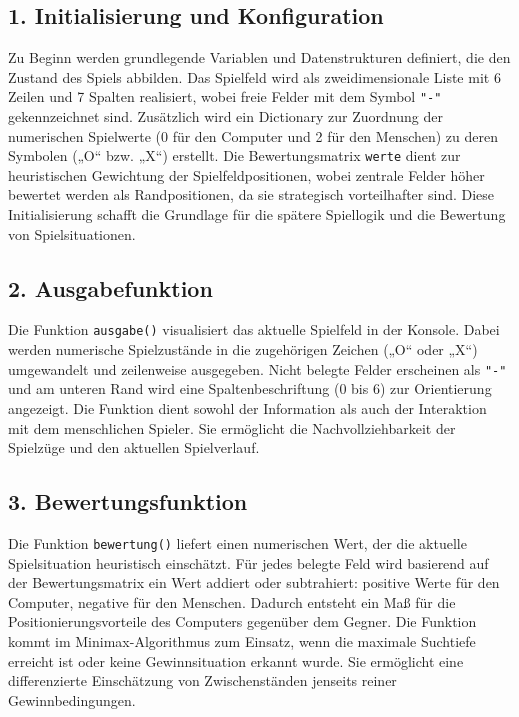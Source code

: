 \subsection*{1. Initialisierung und Konfiguration}

Zu Beginn werden grundlegende Variablen und Datenstrukturen definiert, die den Zustand des Spiels abbilden. Das Spielfeld wird als zweidimensionale Liste mit 6 Zeilen und 7 Spalten realisiert, wobei freie Felder mit dem Symbol \texttt{"-"} gekennzeichnet sind. Zusätzlich wird ein Dictionary zur Zuordnung der numerischen Spielwerte (0 für den Computer und 2 für den Menschen) zu deren Symbolen („O“ bzw. „X“) erstellt. Die Bewertungsmatrix \texttt{werte} dient zur heuristischen Gewichtung der Spielfeldpositionen, wobei zentrale Felder höher bewertet werden als Randpositionen, da sie strategisch vorteilhafter sind. Diese Initialisierung schafft die Grundlage für die spätere Spiellogik und die Bewertung von Spielsituationen.

\subsection*{2. Ausgabefunktion}

Die Funktion \texttt{ausgabe()} visualisiert das aktuelle Spielfeld in der Konsole. Dabei werden numerische Spielzustände in die zugehörigen Zeichen („O“ oder „X“) umgewandelt und zeilenweise ausgegeben. Nicht belegte Felder erscheinen als \texttt{"-"} und am unteren Rand wird eine Spaltenbeschriftung (0 bis 6) zur Orientierung angezeigt. Die Funktion dient sowohl der Information als auch der Interaktion mit dem menschlichen Spieler. Sie ermöglicht die Nachvollziehbarkeit der Spielzüge und den aktuellen Spielverlauf.

\subsection*{3. Bewertungsfunktion}

Die Funktion \texttt{bewertung()} liefert einen numerischen Wert, der die aktuelle Spielsituation heuristisch einschätzt. Für jedes belegte Feld wird basierend auf der Bewertungsmatrix ein Wert addiert oder subtrahiert: positive Werte für den Computer, negative für den Menschen. Dadurch entsteht ein Maß für die Positionierungsvorteile des Computers gegenüber dem Gegner. Die Funktion kommt im Minimax-Algorithmus zum Einsatz, wenn die maximale Suchtiefe erreicht ist oder keine Gewinnsituation erkannt wurde. Sie ermöglicht eine differenzierte Einschätzung von Zwischenständen jenseits reiner Gewinnbedingungen.

